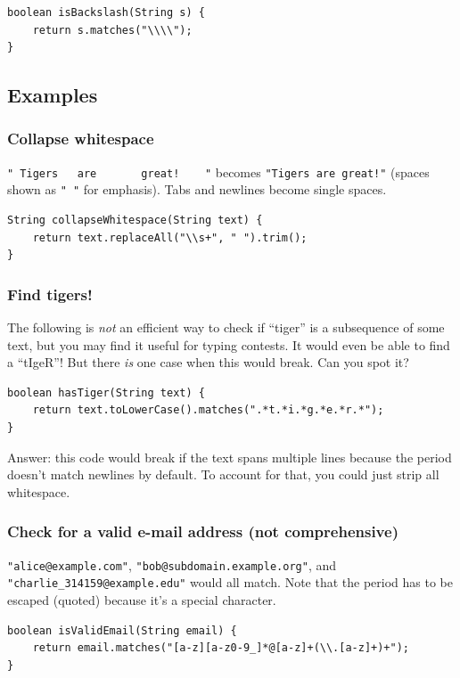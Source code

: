 \documentclass[a4paper,12pt]{article}
\begin{document}
\begin{lstlisting}
boolean isBackslash(String s) {
	return s.matches("\\\\");
}
\end{lstlisting}

\subsection{Examples}

\subsubsection{Collapse whitespace}
\lstinline/" Tigers   are       great!    "/ becomes \lstinline/"Tigers are great!"/ (spaces shown as \lstinline/" "/ for emphasis). Tabs and newlines become single spaces.
\begin{lstlisting}
String collapseWhitespace(String text) {
	return text.replaceAll("\\s+", " ").trim();
}
\end{lstlisting}

\subsubsection{Find tigers!}
The following is {\em not} an efficient way to check if ``tiger'' is a subsequence of some text, but you may find it useful for typing contests. It would even be able to find a ``tIgeR''! But there {\em is} one case when this would break. Can you spot it?
\begin{lstlisting}
boolean hasTiger(String text) {
	return text.toLowerCase().matches(".*t.*i.*g.*e.*r.*");
}
\end{lstlisting}
\noindent Answer: this code would break if the text spans multiple lines because the period doesn't match newlines by default. To account for that, you could just strip all whitespace.

\subsubsection{Check for a valid e-mail address (not comprehensive)}
\lstinline/"alice@example.com"/, \lstinline/"bob@subdomain.example.org"/, and \lstinline/"charlie_314159@example.edu"/ would all match. Note that the period has to be escaped (quoted) because it's a special character.
\begin{lstlisting}
boolean isValidEmail(String email) {
	return email.matches("[a-z][a-z0-9_]*@[a-z]+(\\.[a-z]+)+");
}
\end{lstlisting}
\end{document}
